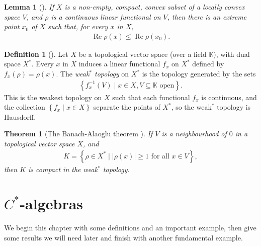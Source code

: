 \documentclass[11pt,a4paper]{report}
\theoremstyle{plain}
\newtheorem*{thm*}{Theorem}
\newtheorem{lemma}{Lemma}
\theoremstyle{definition}
\newtheorem*{defn*}{Definition}
\newcommand{\1}{\mathbbm{1}}
\DeclareMathOperator{\Real}{\operatorname{Re}}
\begin{document}
\begin{lemma}[{\cite[1.4.4]{kadison83}}]\label{lemma:144}
	If $X$ is a non-empty, compact, convex subset of a locally convex space $V$, and $\rho$ is a 
	continuous linear functional on $V$, then there is an extreme point $x_0$ of $X$ such that, for 
	every $x$ in $X$,
	\begin{align*}
		\Real\rho(x) \leq \Real\rho(x_0).
	\end{align*}
\end{lemma}

\begin{defn*}[{\cite[3.14]{rudin91}}]
	Let $X$ be a topological vector space (over a field $\mathbb K$), with dual space $X^\ast$. Every 
	$x$ in $X$ induces a linear functional $f_x$ on $X^\ast$ defined by $f_x(\rho)=\rho(x)$. The 
	\emph{weak$^\ast$ topology} on $X^\ast$ is the topology generated by the sets 
	\begin{align*}
		\left\{f^{-1}_x(V) \mid x \in X, V\subseteq \mathbb K \mbox{ open}\right\}.
	\end{align*}
	This is the weakest topology on $X$ such that each functional $f_x$ is continuous, and the 
	collection $\left\{f_x \mid x\in X\right\}$ separate the points of $X^\ast$, so the weak$^\ast$ topology is 
	Hausdorff.
\end{defn*}

\begin{thm*}[{The Banach-Alaoglu theorem \cite{rudin91}}]
	If $V$ is a neighbourhood of $0$ in a topological vector space $X$, and
	\begin{align*}
		K=\left\{\rho\in X^\ast \mid |\rho(x)|\geq 1 \mbox{ for all } x \in V \right\},
	\end{align*}
	then $K$ is compact in the weak$^\ast$ topology.
\end{thm*}

\chapter{$C^\ast$-algebras}
We begin this chapter with some definitions and an important example, then give some results we 
will need later and finish with another fundamental example.
\end{document}
